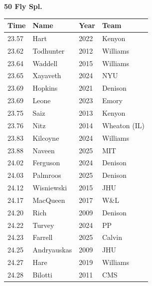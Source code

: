 \noindent\begin{minipage}[t]{0.98\textwidth}
\centering
\textbf{\textcolor{teamprimary}{50 Fly Spl.}}\par
\vspace{0.5em}
\centering
\small
\renewcommand{\arraystretch}{1.0}
\setlength{\tabcolsep}{4pt}
\begin{tabular}{@{}p{2.5cm}p{4.5cm}p{1.5cm}p{2.5cm}@{}}
\toprule
\textbf{Time} & \textbf{Name} & \textbf{Year} & \textbf{Team} \\
\midrule
23.57 & Hart & 2022 & Kenyon \\
23.62 & Todhunter & 2012 & Williams \\
23.64 & Waddell & 2015 & Williams \\
23.65 & Xayaveth & 2024 & NYU \\
23.69 & Hopkins & 2021 & Denison \\
23.69 & Leone & 2023 & Emory \\
23.75 & Saiz & 2013 & Kenyon \\
23.76 & Nitz & 2014 & Wheaton (IL) \\
23.83 & Kilcoyne & 2024 & Williams \\
23.88 & Naveen & 2025 & MIT \\
24.02 & Ferguson & 2024 & Denison \\
24.03 & Palmroos & 2025 & Denison \\
24.12 & Wisniewski & 2015 & JHU \\
24.17 & MacQueen & 2017 & W\&L \\
24.20 & Rich & 2009 & Denison \\
24.22 & Turvey & 2024 & PP \\
24.23 & Farrell & 2025 & Calvin \\
24.25 & Andryauskas & 2009 & JHU \\
24.27 & Hare & 2019 & Williams \\
24.28 & Bilotti & 2011 & CMS \\
\bottomrule
\end{tabular}
\end{minipage}
\vspace{1.2em}
